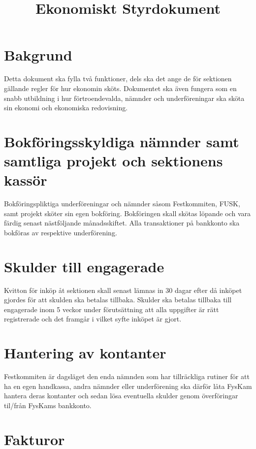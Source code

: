 \documentclass{../resources/dgovdoc}
\title{Ekonomiskt Styrdokument}
\begin{document}
\maketitle

\section{Bakgrund}

Detta dokument ska fylla två funktioner, dels ska det ange de för sektionen gällande regler för hur ekonomin sköts. Dokumentet ska även fungera som en snabb utbildning i hur förtroendevalda, nämnder och underföreningar ska sköta sin ekonomi och ekonomiska redovisning. 

\section{Bokföringsskyldiga nämnder samt samtliga projekt och sektionens kassör}

Bokföringspliktiga underföreningar och nämnder såsom Festkommiten, FUSK, samt projekt sköter sin egen bokföring. Bokföringen skall skötas löpande och vara färdig senast nästföljande månadsskiftet. Alla transaktioner på bankkonto ska bokföras av respektive underförening.

\section{Skulder till engagerade}

Kvitton för inköp åt sektionen skall senast lämnas in 30 dagar efter då inköpet gjordes för att skulden ska betalas tillbaka. Skulder ska betalas tillbaka till engagerade inom 5 veckor under förutsättning att alla uppgifter är rätt registrerade och det framgår i vilket syfte inköpet är gjort. 

\section{Hantering av kontanter}

Festkommiten är dagsläget den enda nämnden som har tillräckliga rutiner för att ha en egen handkassa, andra nämnder eller underförening ska därför låta FysKam hantera deras kontanter och sedan lösa eventuella skulder genom överföringar til/från FysKams bankkonto.

\section{Fakturor}
\end{document}
